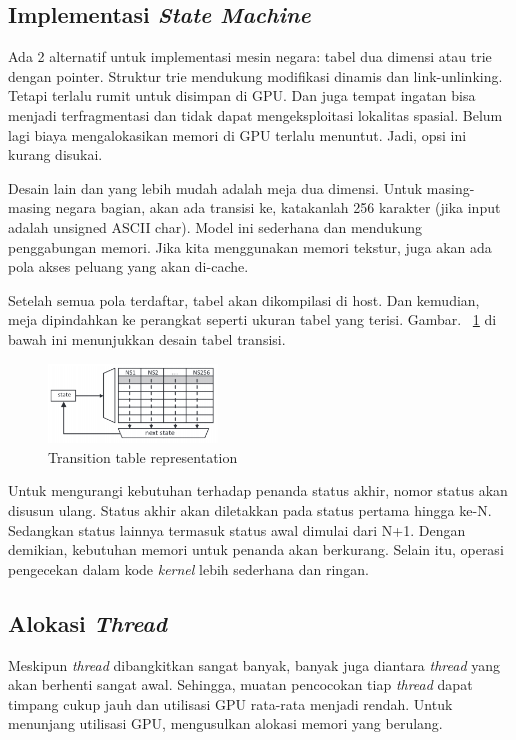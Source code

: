 \documentclass[conference]{IEEEtran}
\begin{document}
    \subsection{Implementasi \emph{State Machine}}
        Ada 2 alternatif untuk implementasi mesin negara: tabel dua dimensi atau trie dengan pointer. Struktur trie mendukung modifikasi dinamis dan link-unlinking. Tetapi terlalu rumit untuk disimpan di GPU. Dan juga tempat ingatan bisa menjadi terfragmentasi dan tidak dapat mengeksploitasi lokalitas spasial. Belum lagi biaya mengalokasikan memori di GPU terlalu menuntut. Jadi, opsi ini kurang disukai.
        
        Desain lain dan yang lebih mudah adalah meja dua dimensi. Untuk masing-masing negara bagian, akan ada transisi ke, katakanlah 256 karakter (jika input adalah unsigned ASCII char). Model ini sederhana dan mendukung penggabungan memori. Jika kita menggunakan memori tekstur, juga akan ada pola akses peluang yang akan di-cache.
        
        Setelah semua pola terdaftar, tabel akan dikompilasi di host. Dan kemudian, meja dipindahkan ke perangkat seperti ukuran tabel yang terisi. Gambar. ~\ref{table} di bawah ini menunjukkan desain tabel transisi.

        \begin{figure}[htbp]
            \centerline{\includegraphics[width=0.4\textwidth]{../src/resources/table.png}}
            \caption{Transition table representation}
            \label{table}
        \end{figure}

        Untuk mengurangi kebutuhan terhadap penanda status akhir, nomor status akan disusun ulang. Status akhir akan diletakkan pada status pertama hingga ke-N. Sedangkan status lainnya termasuk status awal dimulai dari N+1. Dengan demikian, kebutuhan memori untuk penanda akan berkurang. Selain itu, operasi pengecekan dalam kode \emph{kernel} lebih sederhana dan ringan.

    \subsection{Alokasi \emph{Thread}}
        Meskipun \emph{thread} dibangkitkan sangat banyak, banyak juga diantara \emph{thread} yang akan berhenti sangat awal. Sehingga, muatan pencocokan tiap \emph{thread} dapat timpang cukup jauh dan utilisasi GPU rata-rata menjadi rendah. Untuk menunjang utilisasi GPU, \cite{lin2013} mengusulkan alokasi memori yang berulang.
\end{document}
